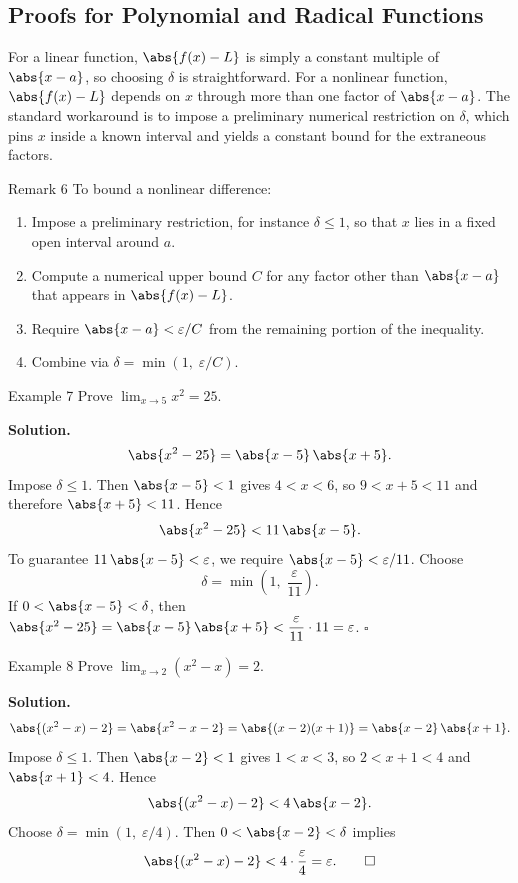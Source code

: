 \subsection*{Proofs for Polynomial and Radical Functions}
\label{subsec:1.4.3}

For a linear function, \(\abs{f(x)-L}\) is simply a constant multiple of \(\abs{x-a}\), so choosing \(\delta\) is straightforward. For a nonlinear function, \(\abs{f(x)-L}\) depends on \(x\) through more than one factor of \(\abs{x-a}\). The standard workaround is to impose a preliminary numerical restriction on \(\delta\), which pins \(x\) inside a known interval and yields a constant bound for the extraneous factors.

\begin{remarkbox}{Remark 6}
To bound a nonlinear difference:
\begin{enumerate}
    \item Impose a preliminary restriction, for instance \(\delta \le 1\), so that \(x\) lies in a fixed open interval around \(a\).
    \item Compute a numerical upper bound \(C\) for any factor other than \(\abs{x-a}\) that appears in \(\abs{f(x)-L}\).
    \item Require \(\abs{x-a} < \varepsilon / C\) from the remaining portion of the inequality.
    \item Combine via \(\delta = \min(1,\; \varepsilon/C)\).
\end{enumerate}
\end{remarkbox}

\begin{examplebox}{Example 7}
Prove \(\displaystyle\lim_{x \to 5} x^{2} = 25\).

\medskip
\textbf{Solution.}
\[
\abs{x^{2} - 25} = \abs{x - 5}\,\abs{x + 5}.
\]
Impose \(\delta \le 1\). Then \(\abs{x - 5} < 1\) gives \(4 < x < 6\), so \(9 < x + 5 < 11\) and therefore \(\abs{x + 5} < 11\). Hence
\[
\abs{x^{2} - 25} < 11\,\abs{x - 5}.
\]
To guarantee \(11\,\abs{x - 5} < \varepsilon\), we require \(\abs{x - 5} < \varepsilon/11\). Choose
\[
\delta = \min\!\left(1,\; \frac{\varepsilon}{11}\right).
\]
If \(0 < \abs{x - 5} < \delta\), then \(\abs{x^{2} - 25} = \abs{x - 5}\,\abs{x + 5} < \dfrac{\varepsilon}{11}\cdot 11 = \varepsilon\). \(\square\)
\end{examplebox}

\begin{examplebox}{Example 8}
Prove \(\displaystyle\lim_{x \to 2} (x^{2} - x) = 2\).

\medskip
\textbf{Solution.}
\[
\abs{(x^{2} - x) - 2} = \abs{x^{2} - x - 2} = \abs{(x - 2)(x + 1)} = \abs{x - 2}\,\abs{x + 1}.
\]
Impose \(\delta \le 1\). Then \(\abs{x - 2} < 1\) gives \(1 < x < 3\), so \(2 < x + 1 < 4\) and \(\abs{x + 1} < 4\). Hence
\[
\abs{(x^{2} - x) - 2} < 4\,\abs{x - 2}.
\]
Choose \(\delta = \min(1,\; \varepsilon/4)\). Then \(0 < \abs{x - 2} < \delta\) implies
\[
\abs{(x^{2} - x) - 2} < 4\cdot\frac{\varepsilon}{4} = \varepsilon.\qquad\square
\]
\end{examplebox}

